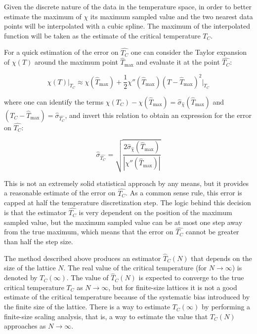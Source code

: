 Given the discrete nature of the data in the temperature space, in order to better estimate the maximum of $\chi$ its maximum sampled value and the two nearest data points will be interpolated with a cubic spline. The maximum of the interpolated function will be taken as the estimate of the critical temperature $T_C$.

For a quick estimation of the error on $\hat{T_C}$ one can consider the Taylor expansion of $\chi(T)$ around the maximum point $\hat{T}_\text{max}$ and evaluate it at the point $\hat{T_C}$:

\begin{equation}
	\chi(T)\big|_{T_C} \approx \chi(\hat{T}_\text{max}) + \frac{1}{2} \chi''(\hat{T}_\text{max}) (T - \hat{T}_\text{max})^2\big|_{T_C}
\end{equation}

where one can identify the terms $\chi(T_C) - \chi(\hat{T}_\text{max}) = \hat{\sigma}_{\hat{\chi}}(\hat{T}_\text{max})$ and $(T_C - \hat{T}_\text{max}) =\hat{\sigma}_{\hat{T_C}}$, and invert this relation to obtain an expression for the error on $\hat{T_C}$:

\begin{equation}
	\hat{\sigma}_{\hat{T_C}} = \sqrt{\frac{2 \hat{\sigma}_{\hat{\chi}}(\hat{T}_\text{max})}{| \chi''(\hat{T}_\text{max}) |} }
\end{equation}

This is not an extremely solid statistical approach by any means, but it provides a reasonable estimate of the error on $\hat{T_C}$. As a common sense rule, this error is capped at half the temperature discretization step. The logic behind this decision is that the estimator $\hat{T_C}$ is very dependent on the position of the maximum sampled value, but the maximum sampled value can be at most one step away from the true maximum, which means that the error on $\hat{T_C}$ cannot be greater than half the step size.

\br

The method described above produces an estimator $\hat{T}_C(N)$ that depends on the size of the lattice $N$. The real value of the critical temperature (for $N \to \infty$) is denoted by $T_C(\infty)$. The value of $\hat{T}_C(N)$ is expected to converge to the true critical temperature $T_C$ as $N \to \infty$, but for finite-size lattices it is not a good estimate of the critical temperature because of the systematic bias introduced by the finite size of the lattice.
There is a way to estimate $T_C(\infty)$ by performing a finite-size scaling analysis, that is, a way to estimate the value that $\hat{T}_C(N)$ approaches as $N \to \infty$.


